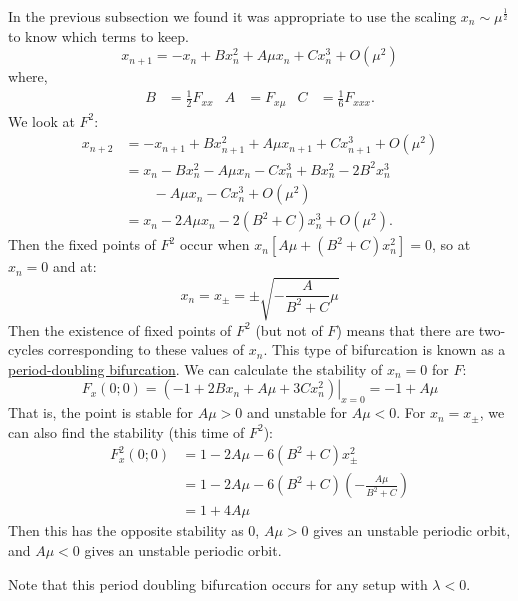 \documentclass[../Main.tex]{subfiles}
\begin{document}
In the previous subsection we found it was appropriate to use the scaling $x_n \sim \mu^{\frac12}$ to know which terms to keep.
\begin{equation*}
    x_{n+1} = -x_n + Bx_n^2 + A\mu x_n + Cx_n^3 + O(\mu^2)
\end{equation*}
where,
\begin{align*}
    B &= \frac12 F_{xx} & A &= F_{x\mu} & C &= \frac16 F_{xxx}.
\end{align*}
We look at $F^2$:
\begin{align*}
    x_{n+2} &= -x_{n+1} + Bx_{n+1}^2 + A\mu x_{n+1} + Cx_{n+1}^3 + O(\mu^2) \\
    &= x_n - Bx_n^2 - A\mu x_n - Cx_n^3 + B x_n^2 - 2B^2 x_n^3 \\
    &\qquad -A\mu x_n - Cx_n^3 + O(\mu^2) \\
    &= x_n - 2A\mu x_n - 2(B^2 + C)x_n^3 + O(\mu^2).
\end{align*}
Then the fixed points of $F^2$ occur when $x_n\left[A\mu + (B^2 + C)x_n^2\right] = 0$, so at $x_n = 0$ and at:
\begin{equation*}
    x_n =x_\pm = \pm \sqrt{-\frac{A}{B^2 + C}\mu}
\end{equation*}
Then the existence of fixed points of $F^2$ (but not of $F$) means that there are two-cycles corresponding to these values of $x_n$. This type of bifurcation is known as a \underline{period-doubling bifurcation}. We can calculate the stability of $x_n = 0$ for $F$:
\begin{equation*}
    F_x(0;0) = \left.(-1 + 2Bx_n + A\mu + 3Cx_n^2)\right|_{x = 0} = -1 + A\mu
\end{equation*}
That is, the point is stable for $A\mu > 0$ and unstable for $A\mu < 0$. For $x_n = x_\pm$, we can also find the stability (this time of $F^2$):
\begin{align*}
    F_x^2(0;0) &= 1 - 2A\mu - 6(B^2 + C)x_\pm^2 \\
    &= 1 - 2 A\mu - 6(B^2 + C) \left(-\frac{A\mu}{B^2 + C}\right) \\
    &= 1 + 4A\mu
\end{align*}
Then this has the opposite stability as $0$, $A\mu > 0$ gives an unstable periodic orbit, and $A\mu < 0$ gives an unstable periodic orbit.

Note that this period doubling bifurcation occurs for any setup with $\lambda < 0$.
\end{document}
